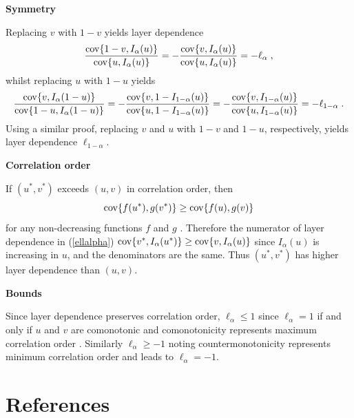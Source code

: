 \documentclass[authoryear]{elsarticle}
\newcommand{\cov}{{\rm cov}}
\newcommand{\eref}[1]{(\ref{#1})}
\begin{document}
\textbf{Symmetry}

Replacing $v$ with $1-v$ yields layer dependence
$$
\frac{\cov\{1-v,I_\alpha(u)\}}{\cov\{u,I_\alpha(u)\}} =
- \frac{\cov\{v,I_\alpha(u)\}}{\cov\{u,I_\alpha(u)\}} = -\ell_\alpha \;,
$$
whilst replacing $u$ with $1-u$ yields
$$
\frac{\cov\{v,I_\alpha(1-u)\}}{\cov\{1-u,I_\alpha(1-u)\}}
=-\frac{\cov\{v,1-I_{1-\alpha}(u)\}}{\cov\{u,1-I_{1-\alpha}(u)\}}
=-\frac{\cov\{v,I_{1-\alpha}(u)\}}{\cov\{u,I_{1-\alpha}(u)\}}
=-\ell_{1-\alpha} \;.
$$
Using a similar proof, replacing $v$ and $u$ with $1-v$ and $1-u$, respectively, yields layer dependence $\ell_{1-\alpha}$.

\textbf{Correlation order}


If $(u^*,v^*)$ exceeds $(u,v)$ in correlation order, then
$$
\cov\{f(u^*),g(v^*)\} \geq \cov\{f(u),g(v)\}
$$
for any non-decreasing functions $f$ and $g$ \citep{dhaene2009correlation}. Therefore the numerator of layer dependence in \eref{ellalpha} $\cov\{v^*,I_\alpha(u^*)\} \geq \cov\{v,I_\alpha(u)\}$ since $I_\alpha(u)$ is increasing in $u$, and the denominators are the same. Thus $(u^*,v^*)$ has higher layer dependence than $(u,v)$.




\textbf{Bounds}

Since layer dependence preserves correlation order, $\ell_\alpha\le 1$ since $\ell_\alpha=1$ if and only if $u$ and $v$ are comonotonic and comonotonicity represents maximum correlation order \citep{dhaene2009correlation}. Similarly $\ell_\alpha \ge -1$ noting countermonotonicity represents minimum correlation order and leads to $\ell_\alpha=-1$.

\newpage


\section*{References}


\end{document}
